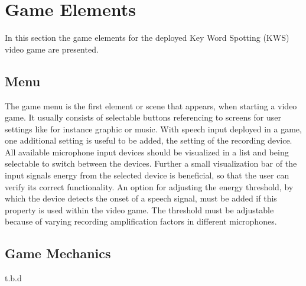 
\section{Game Elements}
\thesisStateNotReady
In this section the game elements for the deployed Key Word Spotting (KWS) video game are presented.



\subsection{Menu}\label{sec:game_interactables_menu}
The game menu is the first element or scene that appears, when starting a video game. 
It usually consists of selectable buttons referencing to screens for user settings like for instance graphic or music.
With speech input deployed in a game, one additional setting is useful to be added, the setting of the recording device.
All available microphone input devices should be visualized in a list and being selectable to switch between the devices.
Further a small visualization bar of the input signals energy from the selected device is beneficial, so that the user can verify its correct functionality.
An option for adjusting the energy threshold, by which the device detects the onset of a speech signal, must be added if this property is used within the video game.
The threshold must be adjustable because of varying recording amplification factors in different microphones.



\subsection{Game Mechanics}
t.b.d


